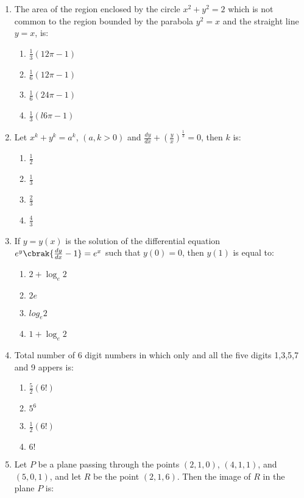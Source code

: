\documentclass{article}
\begin{document}
\begin{enumerate}
\item The area of the region enclosed by the circle $x^2 + y^2 = 2$ which is not common to the region bounded by the parabola $y^2 = x$ and the straight line $y = x$, is:  

\begin{enumerate}
    \item $\frac{1}{3}(12{\pi} - 1)$
    \item $\frac{1}{6}(12\pi - 1)$
    \item $\frac{1}{6}{(24{\pi} -{1})}$
    \item $\frac{1}{3}(l6\pi - 1)$
\end{enumerate}


\item Let $x^k + y^k = a^k$, $(a, k > 0)$ and $\frac{dy}{dx} + ( \frac{y}{x} )^{\frac{1}{3}} = 0$, then $k$ is:

\begin{enumerate}
        \item $\frac{1}{2}$
        \item $\frac{1}{3}$
        \item $\frac{2}{3}$
        \item $\frac{4}{3}$
\end{enumerate}


\item If $y = y(x)$ is the solution of the differential equation $e^y\cbrak{\frac{dy}{dx} - 1} = e^x$ such that $y(0) = 0$, then $y(1)$ is equal to:  

\begin{enumerate}
    \item $2 + \log_e 2$
    \item $2e$
    \item $log_e 2$
    \item $1 + \log_e 2$
\end{enumerate}

\item Total number of 6 digit numbers in which only and all the five digits 1,3,5,7 and 9 appers is:

\begin{enumerate}
	\item $\frac{5}{2}(6!)$
	\item $5^6$
	\item $\frac{1}{2}(6!)$
	\item $6!$	
\end{enumerate}

\item Let $P$ be a plane passing through the points $(2, 1, 0)$, $(4, 1, 1)$, and $(5, 0, 1)$, and let $R$ be the point $(2, 1, 6)$. Then the image of $R$ in the plane $P$ is:


\end{enumerate}
\end{document}

